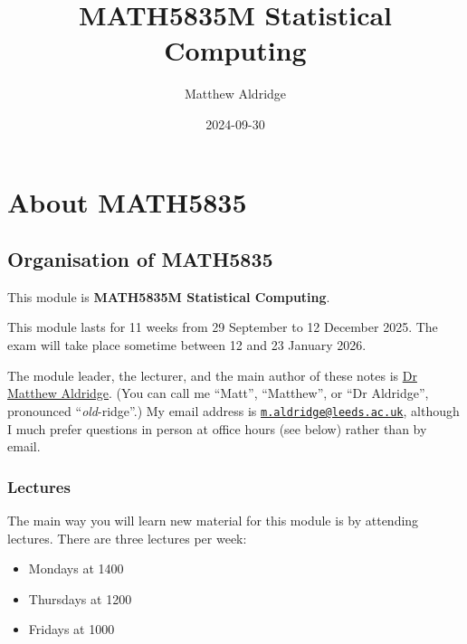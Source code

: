 \documentclass[
  letterpaper,
  DIV=11,
  numbers=noendperiod]{scrreprt}
\title{MATH5835M Statistical Computing}
\author{Matthew Aldridge}
\date{2024-09-30}
\renewcommand*\contentsname{Table of contents}
\newcommand\contentsname{Table of contents}
\theoremstyle{plain}
\theoremstyle{definition}
\theoremstyle{definition}
\theoremstyle{remark}
\begin{document}
\maketitle

\renewcommand*\contentsname{Table of contents}
{
\hypersetup{linkcolor=}
\setcounter{tocdepth}{2}
\tableofcontents
}


\chapter*{About MATH5835}\label{about-math5835}


\section*{Organisation of MATH5835}\label{organisation-of-math5835}


This module is \textbf{MATH5835M Statistical Computing}.

This module lasts for 11 weeks from 29 September to 12 December 2025.
The exam will take place sometime between 12 and 23 January 2026.

The module leader, the lecturer, and the main author of these notes is
\href{https://mpaldridge.github.io/}{Dr Matthew Aldridge}. (You can call
me ``Matt'', ``Matthew'', or ``Dr Aldridge'', pronounced
``\emph{old}-ridge''.) My email address is
\href{mailto:m.aldridge@leeds.ac.uk}{\nolinkurl{m.aldridge@leeds.ac.uk}},
although I much prefer questions in person at office hours (see below)
rather than by email.

\subsection*{Lectures}\label{lectures}

The main way you will learn new material for this module is by attending
lectures. There are three lectures per week:

\begin{itemize}
\item
  Mondays at 1400
\item
  Thursdays at 1200
\item
  Fridays at 1000
\end{itemize}
\end{document}
